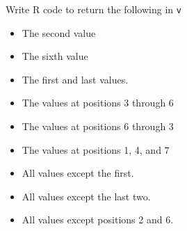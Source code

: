 \documentclass[
  letterpaper,
  DIV=11,
  numbers=noendperiod]{scrreprt}
\begin{document}
Write R code to return the following in \texttt{v}

\begin{itemize}
\item
  The second value
\item
  The sixth value
\item
  The first and last values.
\item
  The values at positions 3 through 6
\item
  The values at positions 6 through 3
\item
  The values at positions 1, 4, and 7
\item
  All values except the first.
\item
  All values except the last two.
\item
  All values except positions 2 and 6.
\end{itemize}
\end{document}
